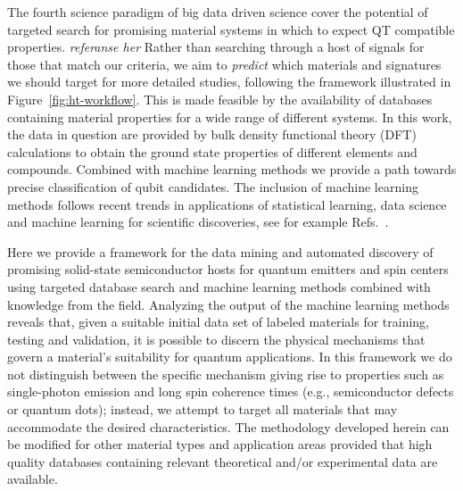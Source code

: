 \documentclass[superscriptaddress,unsortedaddress,
 amsmath,amssymb,
 aps,
]{revtex4-2}
\begin{document}
The fourth science paradigm of big data driven science cover the potential of targeted search for promising material systems in which to expect QT compatible properties. \textit{referanse her} 
Rather than searching through a host of signals for those that match our criteria, we aim to \textit{predict} which materials and signatures we should target for more detailed studies, following the framework illustrated in Figure~\ref{fig:ht-workflow}. 
This is made feasible by the availability of databases containing material properties for a wide range of different systems. In this work, the data in question are provided by bulk density functional theory (DFT) calculations to obtain the ground state properties of different elements and compounds. Combined with machine learning methods we provide a path towards precise classification of qubit candidates. The inclusion of machine learning methods follows recent trends in applications of statistical learning, data science and machine learning for scientific discoveries, see for example Refs.~\cite{deiana2021,Carleo2019}. 

Here we provide a framework for the data mining and automated discovery of promising solid-state semiconductor hosts for quantum emitters and spin centers using targeted database search and machine learning methods combined with knowledge from the field. 
Analyzing the output of the machine learning methods reveals that, given a suitable initial data set of labeled materials for training, testing and validation, it is possible to discern the physical mechanisms that govern a material's suitability for quantum applications.  
In this framework we do not distinguish between the specific mechanism giving rise to properties such as single-photon emission and long spin coherence times (e.g., semiconductor defects or quantum dots); instead, we attempt to target all materials that may accommodate the desired characteristics.  
The methodology developed herein can be modified for other material types and application areas provided that high quality databases containing relevant theoretical and/or experimental data are available. 
\end{document}
